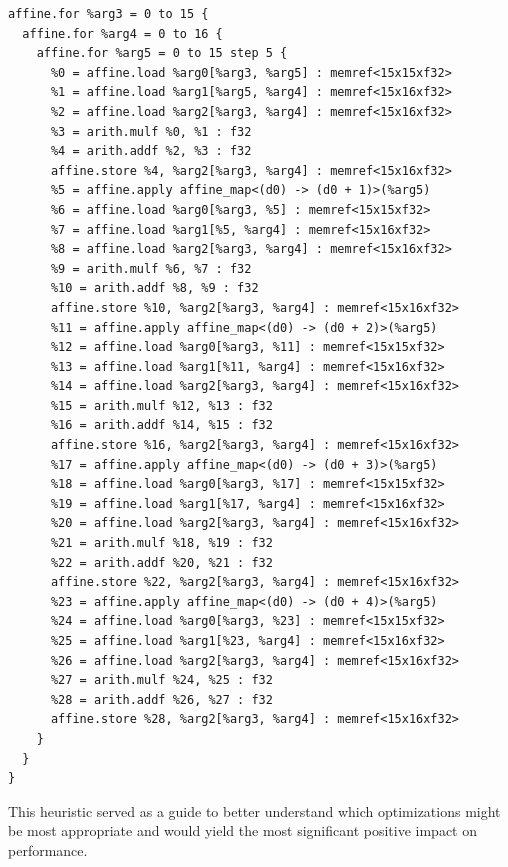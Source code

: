 \begin{lstlisting}[label={lst:affine-mul-unroll3}, caption=Unrolled matrix multiplication in affine dialect with unrolling factor 5, float]
affine.for %arg3 = 0 to 15 {
  affine.for %arg4 = 0 to 16 {
    affine.for %arg5 = 0 to 15 step 5 {
      %0 = affine.load %arg0[%arg3, %arg5] : memref<15x15xf32>
      %1 = affine.load %arg1[%arg5, %arg4] : memref<15x16xf32>
      %2 = affine.load %arg2[%arg3, %arg4] : memref<15x16xf32>
      %3 = arith.mulf %0, %1 : f32
      %4 = arith.addf %2, %3 : f32
      affine.store %4, %arg2[%arg3, %arg4] : memref<15x16xf32>
      %5 = affine.apply affine_map<(d0) -> (d0 + 1)>(%arg5)
      %6 = affine.load %arg0[%arg3, %5] : memref<15x15xf32>
      %7 = affine.load %arg1[%5, %arg4] : memref<15x16xf32>
      %8 = affine.load %arg2[%arg3, %arg4] : memref<15x16xf32>
      %9 = arith.mulf %6, %7 : f32
      %10 = arith.addf %8, %9 : f32
      affine.store %10, %arg2[%arg3, %arg4] : memref<15x16xf32>
      %11 = affine.apply affine_map<(d0) -> (d0 + 2)>(%arg5)
      %12 = affine.load %arg0[%arg3, %11] : memref<15x15xf32>
      %13 = affine.load %arg1[%11, %arg4] : memref<15x16xf32>
      %14 = affine.load %arg2[%arg3, %arg4] : memref<15x16xf32>
      %15 = arith.mulf %12, %13 : f32
      %16 = arith.addf %14, %15 : f32
      affine.store %16, %arg2[%arg3, %arg4] : memref<15x16xf32>
      %17 = affine.apply affine_map<(d0) -> (d0 + 3)>(%arg5)
      %18 = affine.load %arg0[%arg3, %17] : memref<15x15xf32>
      %19 = affine.load %arg1[%17, %arg4] : memref<15x16xf32>
      %20 = affine.load %arg2[%arg3, %arg4] : memref<15x16xf32>
      %21 = arith.mulf %18, %19 : f32
      %22 = arith.addf %20, %21 : f32
      affine.store %22, %arg2[%arg3, %arg4] : memref<15x16xf32>
      %23 = affine.apply affine_map<(d0) -> (d0 + 4)>(%arg5)
      %24 = affine.load %arg0[%arg3, %23] : memref<15x15xf32>
      %25 = affine.load %arg1[%23, %arg4] : memref<15x16xf32>
      %26 = affine.load %arg2[%arg3, %arg4] : memref<15x16xf32>
      %27 = arith.mulf %24, %25 : f32
      %28 = arith.addf %26, %27 : f32
      affine.store %28, %arg2[%arg3, %arg4] : memref<15x16xf32>
    }
  }
}
\end{lstlisting}

This heuristic served as a guide to better understand which optimizations might be most appropriate and would yield the most significant positive impact on performance.


